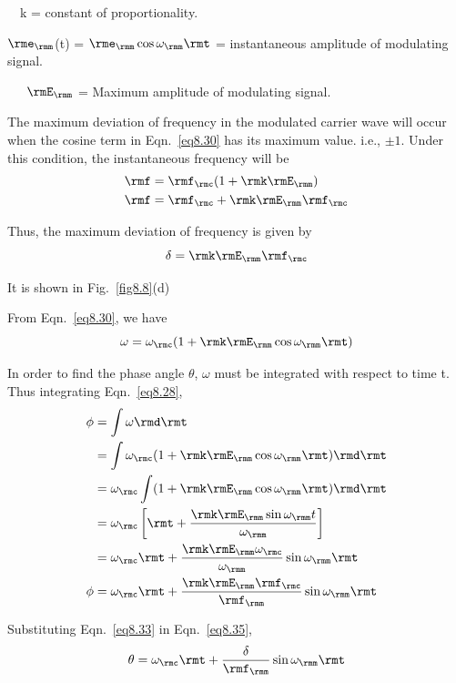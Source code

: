~\quad ~k = constant of proportionality.

$\rme_\rmm$(t) = $\rme_\rmm \cos \omega_\rmm \rmt$ = instantaneous amplitude of modulating signal.

~~~$\rmE_\rmm$ = Maximum amplitude of modulating signal.

The maximum deviation of frequency in the modulated carrier wave will
occur when the cosine term in Eqn.~\eqref{eq8.30} has its maximum
value. i.e., $\pm 1$. Under this condition, the instantaneous
frequency will be
\begin{align}
\rmf & = \rmf_\rmc (1 +\rmk \rmE_\rmm)\label{eq8.31}\\
\rmf & = \rmf_\rmc + \rmk \rmE_\rmm \rmf_\rmc \label{eq8.32}
\end{align}

Thus, the maximum deviation of frequency is given by 
\begin{equation}
\delta = \rmk \rmE_\rmm \rmf_\rmc \label{eq8.33}
\end{equation}

It is shown in Fig.~\ref{fig8.8}(d)

From Eqn.~\eqref{eq8.30}, we have
\begin{equation}
\omega = \omega_\rmc (1 + \rmk \rmE_\rmm \cos \omega_\rmm \rmt)\label{eq8.34}
\end{equation}

In order to find the phase angle $\theta$, $\omega$ must be integrated
with respect to time t. Thus integrating Eqn.~\eqref{eq8.28},
\begin{align}
\phi & = \int \omega \rmd\rmt\notag\\
& = \int \omega_\rmc (1+ \rmk \rmE_\rmm \cos \omega_\rmm \rmt) \rmd\rmt\notag\\
& = \omega_\rmc \int (1 + \rmk \rmE_\rmm \cos \omega_\rmm \rmt) \rmd\rmt\notag\\
& = \omega_\rmc \left[\rmt + \frac{\rmk \rmE_\rmm \sin \omega_\rmm
t}{\omega_\rmm} \right]\notag\\
& = \omega_\rmc \rmt + \frac{\rmk \rmE_\rmm \omega_\rmc}{\omega_\rmm} \sin \omega_\rmm \rmt \notag\\
\phi & = \omega_\rmc \rmt
+ \frac{\rmk \rmE_\rmm \rmf_\rmc}{\rmf_\rmm} \sin \omega_\rmm \rmt\label{eq8.35}
\end{align}

Substituting Eqn.~\eqref{eq8.33} in Eqn.~\eqref{eq8.35}, 
\begin{equation}
\theta = \omega_\rmc \rmt + \frac{\delta}{\rmf_\rmm} \sin \omega_\rmm \rmt\label{eq8.36}
\end{equation}

